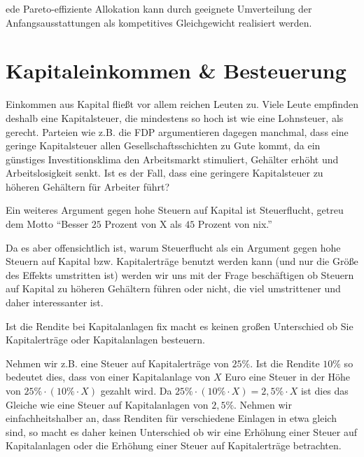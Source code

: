 \begin{theorem}
ede Pareto-effiziente Allokation kann durch geeignete Umverteilung der Anfangsausstattungen als kompetitives Gleichgewicht realisiert werden.
\end{theorem}


\section{Kapitaleinkommen \& Besteuerung}
Einkommen aus Kapital fließt vor allem reichen Leuten zu. Viele Leute
empfinden deshalb eine Kapitalsteuer, die mindestens so hoch ist wie eine
Lohnsteuer, als gerecht. Parteien wie z.B. die FDP argumentieren dagegen
manchmal, dass eine geringe Kapitalsteuer allen Gesellschaftsschichten zu
Gute kommt, da ein günstiges Investitionsklima den Arbeitsmarkt
stimuliert, Gehälter erhöht und Arbeitslosigkeit senkt.
Ist es der Fall, dass eine geringere Kapitalsteuer zu höheren Gehältern für
Arbeiter führt?

\begin{remark}
	Ein weiteres Argument gegen hohe Steuern auf Kapital ist
	Steuerflucht, getreu dem Motto \enquote{Besser $25$ Prozent von X als $45$ Prozent
		von nix.}
\end{remark}


Da es aber offensichtlich ist, warum Steuerflucht als ein Argument gegen
hohe Steuern auf Kapital bzw. Kapitalerträge benutzt werden kann (und
nur die Größe des Effekts umstritten ist) werden wir uns mit der Frage
beschäftigen ob Steuern auf Kapital zu höheren Gehältern führen oder
nicht, die viel umstrittener und daher interessanter ist.


\begin{remark}
	Ist die Rendite bei Kapitalanlagen fix macht es keinen
	großen Unterschied ob Sie Kapitalerträge oder Kapitalanlagen besteuern.
\end{remark}
\begin{example}
	Nehmen wir z.B. eine Steuer auf Kapitalerträge von $25\%$. Ist die Rendite
	$10\%$ so bedeutet dies, dass von einer Kapitalanlage von $X$ Euro eine Steuer
	in der Höhe von $25\%\cdot (10\%\cdot X)$ gezahlt wird. Da $25\%\cdot (10\%\cdot X) = 2,5\%\cdot X$
	ist dies das Gleiche wie eine Steuer auf Kapitalanlagen von $2,5\%$.
	Nehmen wir einfachheitshalber an, dass Renditen für verschiedene Einlagen
	in etwa gleich sind, so macht es daher keinen Unterschied ob wir eine
	Erhöhung einer Steuer auf Kapitalanlagen oder die Erhöhung einer Steuer
	auf Kapitalerträge betrachten.
\end{example}





